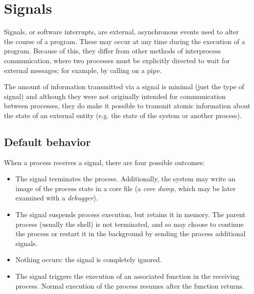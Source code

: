 %
%

\chapter{Signals}
\label{sec/signals}

Signals, or software interrupts, are external, asynchronous events
used to alter the course of a program.  These may occur at any
time during the execution of a program.  Because of this,
they differ from other methods of interprocess communication, where
two processes must be explicitly directed to wait for external messages;
for example, by calling  on a pipe.

The amount of information transmitted via a signal is minimal (just
the type of signal) and although they were not originally
intended for communication between processes, they do make it
possible to transmit atomic information about the state of an
external entity (e.g. the state of the system or another process). 

\section{Default behavior}

When a process receives a signal, there are four possible outcomes:
%
\begin{itemize}
\item 
The signal terminates the process.  Additionally, the system may write
an image of the process state in a core file (a \emph{core dump}, which
may be later examined with a \emph{debugger}).
%
\item 
The signal suspends process execution, but retains it in memory.  The
parent process (usually the shell) is not terminated, and so may
choose to continue the process or restart it in the background by
sending the process additional signals.
%
\item Nothing occurs: the signal is completely ignored.
%
\item The signal triggers the execution of an associated function in the
receiving process.  Normal execution of the process resumes after the
function returns.
\end{itemize}
%

